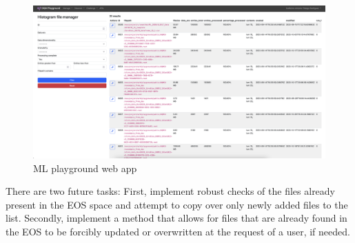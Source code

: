 \begin{figure}
	\centering
	\includegraphics*[width=\linewidth,trim = 1cm 5.2in 13.6in 0]{Images/MLP.png}
	\caption{ML playground web app}
	\label{fig:MLplayground}
\end{figure}


There are two future tasks: First, implement robust checks of the files already present in the EOS space and attempt to copy over only newly added files to the list.
Secondly, implement a method that allows for files that are already found in the EOS to be forcibly updated or overwritten at the request of a user, if needed.
